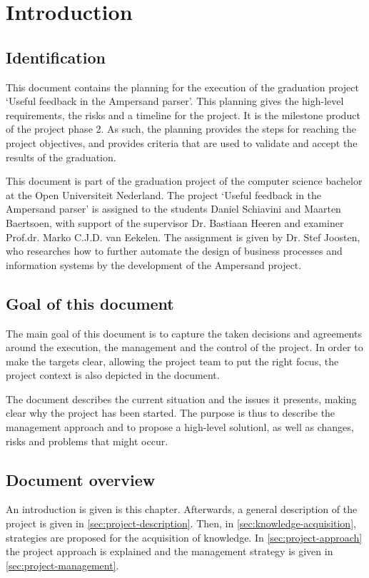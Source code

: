\section{Introduction}
\subsection{Identification}
%
This document contains the planning for the execution of the graduation project `Useful feedback in the Ampersand parser'.
This planning gives the high-level requirements, the risks and a timeline for the project.
It is the milestone product of the project phase 2.
As such, the planning provides the steps for reaching the project objectives, and provides criteria that are used to validate and accept the results of the graduation.

This document is part of the graduation project of the computer science bachelor at the Open Universiteit Nederland.
The project `Useful feedback in the Ampersand parser' is assigned to the students Daniel Schiavini and Maarten Baertsoen, with support of the supervisor Dr. Bastiaan Heeren and examiner Prof.dr. Marko C.J.D. van Eekelen.
The assignment is given by Dr. Stef Joosten, who researches how to further automate the design of business processes and information systems by the development of the Ampersand project.

\subsection{Goal of this document}
The main goal of this document is to capture the taken decisions and agreements around the execution, the management and the control of the project.
In order to make the targets clear, allowing the project team to put the right focus, the project context is also depicted in the document.

The document describes the current situation and the issues it presents, making clear why the project has been started.
The purpose is thus to describe the management approach and to propose a high-level solutionl, as well as changes, risks and problems that might occur.

\subsection{Document overview}
An introduction is given is this chapter.
Afterwards, a general description of the project is given in \autoref{sec:project-description}.
Then, in \autoref{sec:knowledge-acquisition}, strategies are proposed for the acquisition of knowledge.
In \autoref{sec:project-approach} the project approach is explained and the management strategy is given in \autoref{sec:project-management}.

